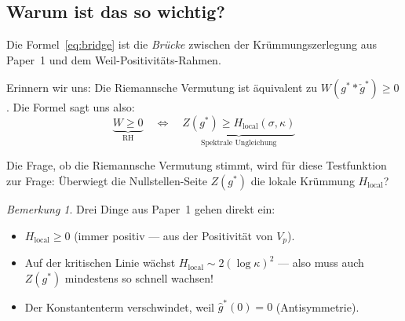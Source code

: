 \documentclass[11pt,a4paper]{article}
\theoremstyle{plain}
\theoremstyle{definition}
\theoremstyle{remark}
\newtheorem{remark}[theorem]{Bemerkung}
\newcommand{\Hlocal}{H_{\mathrm{local}}}
\begin{document}
	\begin{center}
	\end{center}
	
	\subsection{Warum ist das so wichtig?}
	
	Die Formel~\eqref{eq:bridge} ist die \emph{Br\"ucke} zwischen der
	Kr\"ummungszerlegung aus Paper~1 und dem Weil-Positivit\"ats-Rahmen.
	
	Erinnern wir uns: Die Riemannsche Vermutung ist \"aquivalent zu
	$W(g^* * \check{g}^*) \geq 0$. Die Formel sagt uns also:
	\[
	\underbrace{W \geq 0}_{\text{RH}}
	\quad\Longleftrightarrow\quad
	\underbrace{Z(g^*) \geq \Hlocal(\sigma,\kappa)}_{\text{Spektrale Ungleichung}}
	\]
	
	Die Frage, ob die Riemannsche Vermutung stimmt, wird f\"ur diese Testfunktion
	zur Frage: \"Uberwiegt die Nullstellen-Seite $Z(g^*)$ die lokale
	Kr\"ummung $\Hlocal$?
	
	\begin{remark}
		Drei Dinge aus Paper~1 gehen direkt ein:
		\begin{itemize}
			\item $\Hlocal \geq 0$ (immer positiv --- aus der Positivit\"at von $V_p$).
			\item Auf der kritischen Linie w\"achst $\Hlocal \sim 2(\log\kappa)^2$
			--- also muss auch $Z(g^*)$ mindestens so schnell wachsen!
			\item Der Konstantenterm verschwindet, weil $\hat{g}^*(0) = 0$
			(Antisymmetrie).
		\end{itemize}
	\end{remark}
	
\end{document}
